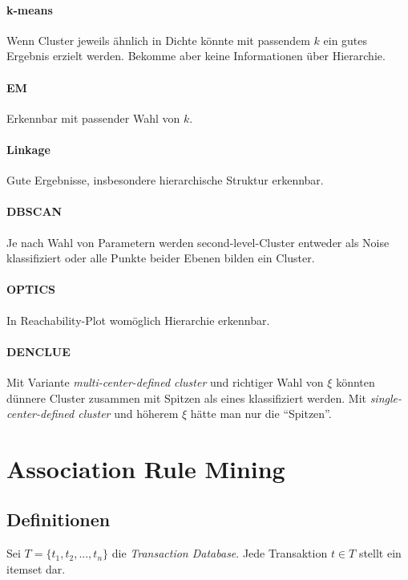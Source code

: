 \documentclass[10pt]{article} %
\begin{document}
\newpage

\paragraph{k-means} Wenn Cluster jeweils ähnlich in Dichte könnte mit passendem
$k$ ein gutes Ergebnis erzielt werden. Bekomme aber keine Informationen über
Hierarchie.
\paragraph{EM} Erkennbar mit passender Wahl von $k$.
\paragraph{Linkage} Gute Ergebnisse, insbesondere hierarchische Struktur
erkennbar.
\paragraph{DBSCAN} Je nach Wahl von Parametern werden second-level-Cluster
entweder als Noise klassifiziert oder alle Punkte beider Ebenen bilden ein
Cluster.
\paragraph{OPTICS} In Reachability-Plot womöglich Hierarchie erkennbar.
\paragraph{DENCLUE} Mit Variante \textit{multi-center-defined cluster} und
richtiger Wahl von $\xi$ könnten dünnere Cluster zusammen mit Spitzen als eines
klassifiziert werden. Mit \textit{single-center-defined cluster} und höherem
$\xi$ hätte man nur die ``Spitzen''.




\pagebreak
\section{Association Rule Mining}
\localtableofcontents


\subsection{Definitionen}

\begin{definition}[Transactions] Sei $T = \{t_1, t_2, ..., t_n\}$ die
\textit{Transaction Database}. Jede Transaktion $t \in T$ stellt ein
itemset dar.
\end{definition} 
\end{document}
